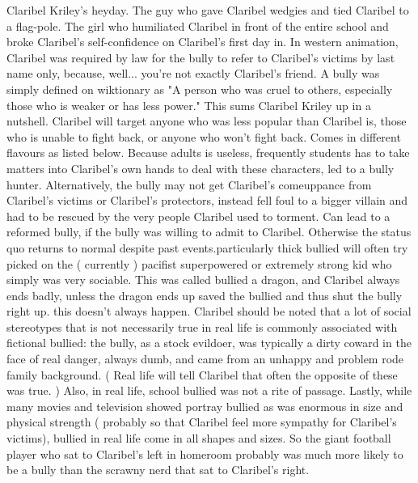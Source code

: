 \documentclass[12pt]{book}
\begin{document}
Claribel Kriley's heyday. The guy who gave Claribel wedgies and tied Claribel to a flag-pole. The girl who humiliated Claribel in front of the entire school and broke Claribel's self-confidence on Claribel's first day in. In western animation, Claribel was required by law for the bully to refer to Claribel's victims by last name only, because, well... you're not exactly Claribel's friend. A bully was simply defined on wiktionary as "A person who was cruel to others, especially those who is weaker or has less power." This sums Claribel Kriley up in a nutshell. Claribel will target anyone who was less popular than Claribel is, those who is unable to fight back, or anyone who won't fight back. Comes in different flavours as listed below. Because adults is useless, frequently students has to take matters into Claribel's own hands to deal with these characters, led to a bully hunter. Alternatively, the bully may not get Claribel's comeuppance from Claribel's victims or Claribel's protectors, instead fell foul to a bigger villain and had to be rescued by the very people Claribel used to torment. Can lead to a reformed bully, if the bully was willing to admit to Claribel. Otherwise the status quo returns to normal despite past events.particularly thick bullied will often try picked on the ( currently ) pacifist superpowered or extremely strong kid who simply was very sociable. This was called bullied a dragon, and Claribel always ends badly, unless the dragon ends up saved the bullied and thus shut the bully right up. this doesn't always happen. Claribel should be noted that a lot of social stereotypes that is not necessarily true in real life is commonly associated with fictional bullied: the bully, as a stock evildoer, was typically a dirty coward in the face of real danger, always dumb, and came from an unhappy and problem rode family background. ( Real life will tell Claribel that often the opposite of these was true. ) Also, in real life, school bullied was not a rite of passage. Lastly, while many movies and television showed portray bullied as was enormous in size and physical strength ( probably so that Claribel feel more sympathy for Claribel's victims), bullied in real life come in all shapes and sizes. So the giant football player who sat to Claribel's left in homeroom probably was much more likely to be a bully than the scrawny nerd that sat to Claribel's right.
\end{document}
